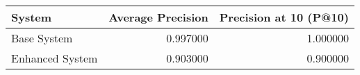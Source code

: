 \begin{tabular}{lrr}
\toprule
System & Average Precision & Precision at 10 (P@10) \\
\midrule
Base System & 0.997000 & 1.000000 \\
Enhanced System & 0.903000 & 0.900000 \\
\bottomrule
\end{tabular}
